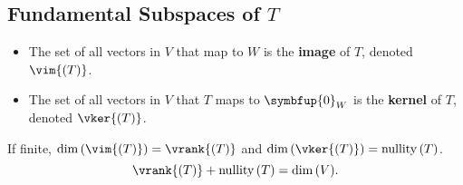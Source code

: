 \documentclass{article}
\DeclareMathOperator*{\nullity}{nullity}
\begin{document}
\begin{multicols*}{3}
    \subsection{Fundamental Subspaces of \texorpdfstring{\(T\)}{T}}
    \begin{itemize}
        \item The set of all vectors in \(V\) that map to \(W\) is the
              \textbf{image} of \(T\), denoted \(\vim{\left( T
              \right)}\).
        \item The set of all vectors in \(V\) that \(T\) maps to
              \(\symbfup{0}_W\) is the \textbf{kernel} of \(T\),
              denoted \(\vker{\left( T \right)}\).
    \end{itemize}
    If finite, \(\dim{\left( \vim{\left( T \right)} \right)} = \vrank{\left( T \right)}\)
    and \(\dim{\left( \vker{\left( T \right)} \right)} = \nullity{\left( T \right)}\).
    \begin{equation*}
        \vrank{\left( T \right)} + \nullity{\left( T \right)} = \dim{\left( V \right)}.
    \end{equation*}

\end{multicols*}
\end{document}
